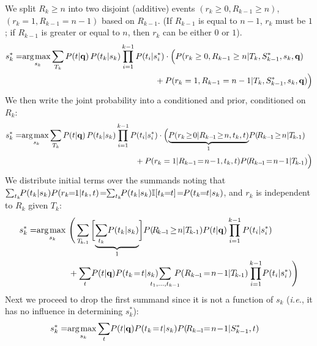 We split $R_k \geq n$ into two disjoint (additive) events
$(r_k \! \geq \! 0, R_{k\!-\!1}\!\geq \!n)$, $(r_k\!\!=\!\!1, R_{k\!-\!1}\!\!=\!\!n\!-\!1)$ based on $R_{k-1}$. (If $R_{k-1}$ is equal to $n\!-\!1$, $r_k$ must be $1$; if $R_{k-1}$ is greater or equal to $n$, then $r_k$ can be either $0$ or $1$). 
\begin{align}
 s_k^* = & \argmax_{s_k} \!\sum_{T_k} P(t|\vec{q}) \,P(t_k|s_k) \prod_{i=1}^{k-1} P(t_i|s_i^*) \cdot \Bigl( P(r_k\geq 0, R_{k-1}\geq n|T_k,S_{k-1}^*,s_k,\vec{q}) \nonumber \\
  & \hspace{56mm} + P(r_k = 1, R_{k-1} = n-1|T_k,S_{k-1}^*,s_k,\vec{q}) \Big) \nonumber 
\end{align}
We then write the joint probability into a conditioned and prior, conditioned on $R_k$:
\begin{align}
 s_k^* = & \argmax_{s_k} \!\sum_{T_k} P(t|\vec{q}) \,P(t_k|s_k) \prod_{i=1}^{k-1} P(t_i|s_i^*) \cdot \Bigl( \mbox{$\underbrace{P(r_k\!\geq\!0|R_{k-\!1}\!\geq\!n,t_k,t)}_{1}$} P(\!R_{k-\!1}\!\geq\!n|\TlessK) \nonumber \\
  & \hspace{50mm} + P(r_k=1|R_{k-1}\!=\!n\!-\!1,t_k,t) P(\!R_{k-\!1}\!=\!n\!-\!1|\TlessK) \Big) \nonumber 
\end{align}
We distribute initial terms over the summands noting that 
$\sum_{t_k} \!\! P(t_k|s_k) P(r_k\!\!=\!\!1|t_k,t) \! = \!\! \sum_{t_k} \!\! P(t_k|s_k) \I[t_k\!\!=\!\!t] \! = \!\! P(t_k\!\!=\!\!t|s_k)$,
and $r_k$ is independent to $R_k$ given $T_k$:
\begin{align}
 s_k^* = & \argmax_{s_k} \Bigg( \sum_{\TlessK} \bigg[ \mbox{$\underbrace{ \sum_{t_k} \!P(t_k|s_k) }_{1}$} \bigg] P(\!R_{\!k-\!1}\!\geq\!n|\TlessK) P(t|\vec{q}) \prod_{i=1}^{k-1} P(t_i|s_i^*) \nonumber \\
  & \hspace{13mm} + \sum_{t} \!P(t|\vec{q}) P(t_k\!=\!t|s_k) \hspace{-4mm} \sum_{t_1, \dots, t_{k-1}} \hspace{-3mm} P(R_{k-\!1}\!=\!n\!-\!1|\TlessK) \prod_{i=1}^{k-1} \!P(t_i|s_i^*) \Bigg) \nonumber
\end{align}
Next we proceed to drop the first summand since it is not a function of $s_k$ (\emph{i.e.},
it has no influence in determining $s_k^*$):
\begin{align}
s_k^* = & \argmax_{s_k} \!\sum_{t} \!P(t|\vec{q}) P(t_k\!=\!t|s_k) P(\!R_{k-\!1}\!\!=\!n\!-\!1|S_{k-1}^*, t) \label{eq.ncall}
\end{align}

